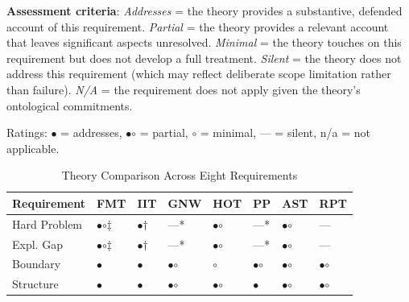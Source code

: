 \documentclass[12pt]{article}
\begin{document}
\textbf{Assessment criteria}: \emph{Addresses} = the theory provides a substantive, defended account of this requirement. \emph{Partial} = the theory provides a relevant account that leaves significant aspects unresolved. \emph{Minimal} = the theory touches on this requirement but does not develop a full treatment. \emph{Silent} = the theory does not address this requirement (which may reflect deliberate scope limitation rather than failure). \emph{N/A} = the requirement does not apply given the theory's ontological commitments.

Ratings: {$\bullet$} = addresses, {\large$\bullet$\hspace{-8.5pt}$\circ$} = partial, {$\circ$} = minimal, --- = silent, n/a = not applicable.

\begin{table}[H]
\caption{Theory Comparison Across Eight Requirements}
\label{tab:theory-comparison}
\centering
\footnotesize
\begin{tabularx}{\textwidth}{lXXXXXXX}
\toprule
\textbf{Requirement} & \textbf{FMT} & \textbf{IIT} & \textbf{GNW} & \textbf{HOT} & \textbf{PP} & \textbf{AST} & \textbf{RPT} \\
\midrule
Hard Problem & {\large$\bullet$\hspace{-8.5pt}$\circ$}$\ddagger$ & {$\bullet$}$\dagger$ & ---* & {\large$\bullet$\hspace{-8.5pt}$\circ$} & ---* & {\large$\bullet$\hspace{-8.5pt}$\circ$} & --- \\
Expl. Gap & {\large$\bullet$\hspace{-8.5pt}$\circ$}$\ddagger$ & {$\bullet$}$\dagger$ & ---* & {\large$\bullet$\hspace{-8.5pt}$\circ$} & ---* & {\large$\bullet$\hspace{-8.5pt}$\circ$} & --- \\
Boundary & {$\bullet$} & {$\bullet$} & {\large$\bullet$\hspace{-8.5pt}$\circ$} & {$\circ$} & {\large$\bullet$\hspace{-8.5pt}$\circ$} & {\large$\bullet$\hspace{-8.5pt}$\circ$} & {\large$\bullet$\hspace{-8.5pt}$\circ$} \\
Structure & {$\bullet$} & {$\bullet$} & {\large$\bullet$\hspace{-8.5pt}$\circ$} & {\large$\bullet$\hspace{-8.5pt}$\circ$} & {$\bullet$} & {\large$\bullet$\hspace{-8.5pt}$\circ$} & {\large$\bullet$\hspace{-8.5pt}$\circ$} \\

\end{tabularx}
\end{table}
\end{document}
